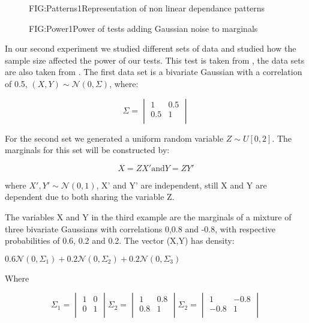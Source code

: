 \begin{figure}[Non linear dependance patterns example 1]{FIG:Patterns1}{Representation of non linear dependance patterns}
\end{figure}

\begin{figure}[Power of tests uniform marginals same size adding noise]{FIG:Power1}{Power of tests adding Gaussian noise to marginals}
\end{figure}

In our second experiment we studied different sets of data and studied how the sample size affected the power of our tests. This test is taken from \cite{Size}, the data sets are also taken from \cite{Size}.
The first data set is a bivariate Gaussian with a correlation of 0.5, $(X,Y)\sim \mathcal{N}(0,\Sigma)$, where:

$$\Sigma =
\begin{vmatrix}
1&0.5\\
0.5&1\\
\end{vmatrix}
$$

For the second set we generated a uniform random variable $Z\sim U[0,2]$. The marginals for this set will be constructed by:

$$X=ZX' \text{and} Y = ZY'$$

where $X',Y' \sim \mathcal{N}(0,1)$, X' and Y' are independent, still X and Y are dependent due to both sharing the variable Z.

The variables X and Y in the third example are the marginals of a mixture of three bivariate Gaussians with correlations 0,0.8 and -0.8, with respective probabilities of 0.6, 0.2 and 0.2. 
The vector (X,Y) has density:

$0.6\mathcal{N}(0,\Sigma_{1}) + 0.2\mathcal{N}(0,\Sigma_{2}) + 0.2\mathcal{N}(0,\Sigma_{3})$

Where 

$$\Sigma_{1} =\begin{vmatrix}1&0\\0&1\\ \end{vmatrix} \Sigma_{2} =\begin{vmatrix}1&0.8\\0.8&1\\ \end{vmatrix} \Sigma_{2} =\begin{vmatrix}1&-0.8\\-0.8&1\\ \end{vmatrix}$$

